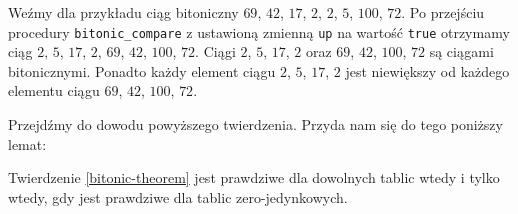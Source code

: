 Weźmy dla przykładu ciąg bitoniczny $69$, $42$, $17$, $2$, $2$, $5$, $100$, $72$.
Po przejściu procedury \texttt{bitonic\_compare} z ustawioną zmienną \texttt{up} na wartość \texttt{true} otrzymamy ciąg $2$, $5$, $17$, $2$, $69$, $42$, $100$, $72$.
Ciągi $2$, $5$, $17$, $2$ oraz $69$, $42$, $100$, $72$ są ciągami bitonicznymi.
Ponadto każdy element ciągu $2$, $5$, $17$, $2$ jest niewiększy od każdego elementu ciągu $69$, $42$, $100$, $72$.

Przejdźmy do dowodu powyższego twierdzenia.
Przyda nam się do tego poniższy lemat:

\begin{lemma}
 Twierdzenie \ref{bitonic-theorem} jest prawdziwe dla dowolnych tablic wtedy i tylko wtedy, gdy jest prawdziwe dla tablic zero-jedynkowych.
 \label{zero-one-lemma}
\end{lemma}

